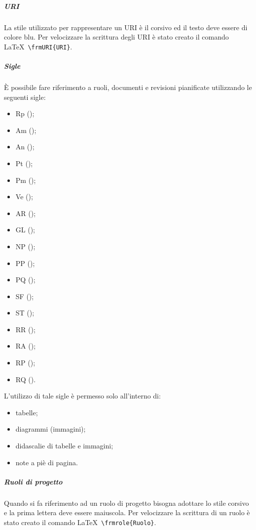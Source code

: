 \documentclass[../NormeProgetto.tex]{subfiles}
\begin{document}
			\subparagraph{URI}
				La stile utilizzato per rappresentare un URI è il corsivo ed il testo deve essere di colore blu. Per velocizzare la scrittura degli URI è stato creato il comando \LaTeX\ \texttt{\textbackslash frmURI\{URI\}}.
			 
			\subparagraph{Sigle}
				È possibile fare riferimento a ruoli, documenti e revisioni pianificate utilizzando le seguenti sigle:
				\begin{itemize}
					\item Rp (\responsabilediprogetto);
					\item Am (\amministratore);
					\item An (\analista);
					\item Pt (\progettista);
					\item Pm (\programmatore);
					\item Ve (\verificatore);
					
					\item AR (\analisideirequisiti);
					\item GL (\glossario);
					\item NP (\normediprogetto);
					\item PP (\pianodiprogetto);
					\item PQ (\pianodiqualifica);
					\item SF (\studiodifattibilita);
					\item ST (\specificatecnica);
					
					\item RR (\revisionedeirequisiti);
					\item RA (\revisionediaccettazione);
					\item RP (\revisionediprogettazione);
					\item RQ (\revisionediqualifica).
				\end{itemize}
				L'utilizzo di tale sigle è permesso solo all'interno di:
				\begin{itemize}
					\item tabelle;
					\item diagrammi (immagini);
					\item didascalie di tabelle e immagini;
					\item note a piè di pagina.
				\end{itemize}
			\subparagraph{Ruoli di progetto}
				Quando si fa riferimento ad un ruolo di progetto bisogna adottare lo stile corsivo e la prima lettera deve essere maiuscola. 	 Per velocizzare la scrittura di un ruolo è stato creato il comando \LaTeX\ \texttt{\textbackslash frmrole\{Ruolo\}}. 
			
\end{document}
